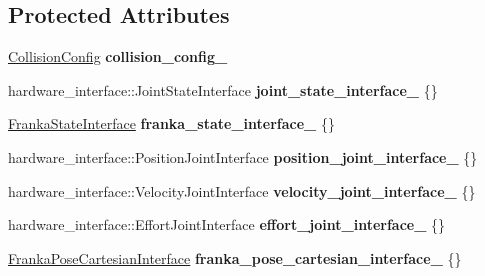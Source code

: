 \subsection*{Protected Attributes}
\begin{DoxyCompactItemize}
\item 
\mbox{\label{classfranka__hw_1_1_franka_h_w_adc6ac201c82bfe71c0309cd32e361cdf}} 
\hyperlink{structfranka__hw_1_1_franka_h_w_1_1_collision_config}{Collision\+Config} {\bfseries collision\+\_\+config\+\_\+}
\item 
\mbox{\label{classfranka__hw_1_1_franka_h_w_a71a3f8c221792e3d833ac3d50e61a8fc}} 
hardware\+\_\+interface\+::\+Joint\+State\+Interface {\bfseries joint\+\_\+state\+\_\+interface\+\_\+} \{\}
\item 
\mbox{\label{classfranka__hw_1_1_franka_h_w_a2b197ae6181a03bc25875a7e5231d6c2}} 
\hyperlink{classfranka__hw_1_1_franka_state_interface}{Franka\+State\+Interface} {\bfseries franka\+\_\+state\+\_\+interface\+\_\+} \{\}
\item 
\mbox{\label{classfranka__hw_1_1_franka_h_w_aed81f869c0785e8257c9b21ce3a54f48}} 
hardware\+\_\+interface\+::\+Position\+Joint\+Interface {\bfseries position\+\_\+joint\+\_\+interface\+\_\+} \{\}
\item 
\mbox{\label{classfranka__hw_1_1_franka_h_w_aae00e8f592019644703aaebcc8b6d8db}} 
hardware\+\_\+interface\+::\+Velocity\+Joint\+Interface {\bfseries velocity\+\_\+joint\+\_\+interface\+\_\+} \{\}
\item 
\mbox{\label{classfranka__hw_1_1_franka_h_w_a5f695d0eb767c02397372cb5536db00c}} 
hardware\+\_\+interface\+::\+Effort\+Joint\+Interface {\bfseries effort\+\_\+joint\+\_\+interface\+\_\+} \{\}
\item 
\mbox{\label{classfranka__hw_1_1_franka_h_w_a7086c73e105997fe775d873ece1a177b}} 
\hyperlink{classfranka__hw_1_1_franka_pose_cartesian_interface}{Franka\+Pose\+Cartesian\+Interface} {\bfseries franka\+\_\+pose\+\_\+cartesian\+\_\+interface\+\_\+} \{\}
\item 

\end{DoxyCompactItemize}
